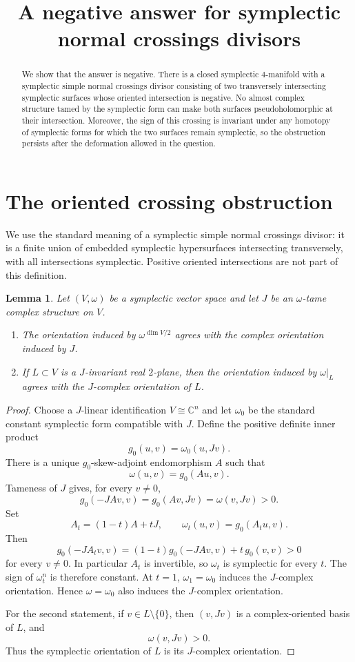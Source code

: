 \documentclass[11pt]{article}
\title{A negative answer for symplectic normal crossings divisors}
\author{}
\date{}
\newtheorem{lemma}[theorem]{Lemma}
\theoremstyle{definition}
\theoremstyle{remark}
\newcommand{\C}{\mathbb{C}}
\begin{document}
\maketitle

\begin{abstract}
We show that the answer is negative. There is a closed symplectic
$4$-manifold with a symplectic simple normal crossings divisor consisting of
two transversely intersecting symplectic surfaces whose oriented intersection
is negative. No almost complex structure tamed by the symplectic form can make
both surfaces pseudoholomorphic at their intersection. Moreover, the sign of
this crossing is invariant under any homotopy of symplectic forms for which
the two surfaces remain symplectic, so the obstruction persists after the
deformation allowed in the question.
\end{abstract}

\section{The oriented crossing obstruction}

We use the standard meaning of a symplectic simple normal crossings divisor:
it is a finite union of embedded symplectic hypersurfaces intersecting
transversely, with all intersections symplectic. Positive oriented
intersections are not part of this definition.

\begin{lemma}\label{lem:tame-orientation}
Let $(V,\omega)$ be a symplectic vector space and let $J$ be an
$\omega$-tame complex structure on $V$.
\begin{enumerate}
\item The orientation induced by $\omega^{\dim V/2}$ agrees with the complex
orientation induced by $J$.
\item If $L\subset V$ is a $J$-invariant real $2$-plane, then the
orientation induced by $\omega|_L$ agrees with the $J$-complex orientation
of $L$.
\end{enumerate}
\end{lemma}

\begin{proof}
Choose a $J$-linear identification $V\cong \C^n$ and let $\omega_0$ be the
standard constant symplectic form compatible with $J$. Define the positive
definite inner product
\[
g_0(u,v)=\omega_0(u,Jv).
\]
There is a unique $g_0$-skew-adjoint endomorphism $A$ such that
\[
\omega(u,v)=g_0(Au,v).
\]
Tameness of $J$ gives, for every $v\neq 0$,
\[
g_0(-JAv,v)=g_0(Av,Jv)=\omega(v,Jv)>0.
\]
Set
\[
A_t=(1-t)A+tJ,\qquad
\omega_t(u,v)=g_0(A_tu,v).
\]
Then
\[
g_0(-JA_tv,v)
=(1-t)g_0(-JAv,v)+t\,g_0(v,v)>0
\]
for every $v\neq0$. In particular $A_t$ is invertible, so $\omega_t$ is
symplectic for every $t$. The sign of $\omega_t^n$ is therefore constant.
At $t=1$, $\omega_1=\omega_0$ induces the $J$-complex orientation. Hence
$\omega=\omega_0$ also induces the $J$-complex orientation.

For the second statement, if $v\in L\setminus\{0\}$, then $(v,Jv)$ is a
complex-oriented basis of $L$, and
\[
\omega(v,Jv)>0.
\]
Thus the symplectic orientation of $L$ is its $J$-complex orientation.
\end{proof}
\end{document}
